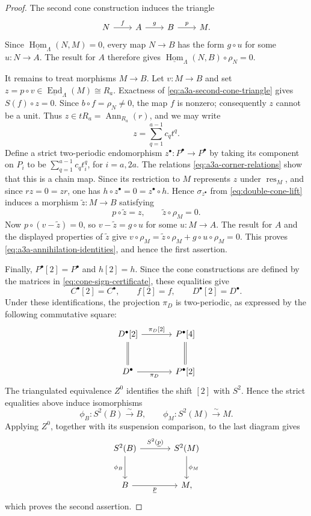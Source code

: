 \documentclass[a4paper,11pt,reqno]{amsart}
\theoremstyle{definition}
\theoremstyle{plain}
\numberwithin{equation}{section}
\newcommand{\Hom}{\operatorname{Hom}}
\newcommand{\End}{\operatorname{End}}
\begin{document}
\begin{proof}
The second cone construction induces the triangle
\begin{equation}
\label{eq:a3a-second-cone-triangle}
\begin{tikzcd}[column sep=2.2em]
N\arrow[r,"f"]&A\arrow[r,"g"]&B\arrow[r,"p"]&M.
\end{tikzcd}
\end{equation}
Since
\(\underline{\Hom}_\Lambda(N,M)=0\), every map \(N\to B\) has the form
\(g\circ u\) for some \(u:N\to A\).  The result for \(A\) therefore gives
\(\underline{\Hom}_\Lambda(N,B)\circ\rho_N=0\).

It remains to treat morphisms \(M\to B\).
Let \(v:M\to B\) and set \(z=p\circ v\in
\underline{\End}_\Lambda(M)\cong R_a\).  Exactness of
\eqref{eq:a3a-second-cone-triangle} gives \(S(f)\circ z=0\).  Since
\(b\circ f=\rho_N\ne0\), the map \(f\) is nonzero; consequently \(z\)
cannot be a unit.  Thus
\(z\in tR_a=\operatorname{Ann}_{R_a}(r)\), and we may write
\[
 z=\sum_{q=1}^{a-1}c_qt^q.
\]
Define a strict two-periodic endomorphism
\(z^\bullet:P^\bullet\to P^\bullet\) by taking its component on \(P_i\)
to be \(\sum_{q=1}^{a-1}c_qt_i^q\), for \(i=a,2a\).  The relations
\eqref{eq:a3a-corner-relations} show that this is a chain map.  Since
its restriction to \(M\) represents \(z\) under
\(\operatorname{res}_M\), and since
\(rz=0=zr\), one has
\(h\circ z^\bullet=0=z^\bullet\circ h\).  Hence
\(\sigma_{z^\bullet}\) from \eqref{eq:double-cone-lift} induces a morphism
\(\widetilde z:M\to B\) satisfying
\[
 p\circ\widetilde z=z,
 \qquad
 \widetilde z\circ\rho_M=0.
\]
Now \(p\circ(v-\widetilde z)=0\), so
\(v-\widetilde z=g\circ u\) for some \(u:M\to A\).  The result for \(A\)
and the displayed properties of \(\widetilde z\) give
\(v\circ\rho_M
=\widetilde z\circ\rho_M+g\circ u\circ\rho_M=0\).
This proves \eqref{eq:a3a-annihilation-identities}, and hence the first
assertion.

Finally, \(P^\bullet[2]=P^\bullet\) and \(h[2]=h\).  Since the cone
constructions are defined by the matrices in
\eqref{eq:cone-sign-certificate}, these equalities give
\[
 C^\bullet[2]=C^\bullet,\qquad
 f[2]=f,\qquad
 D^\bullet[2]=D^\bullet.
\]
Under these identifications, the projection \(\pi_D\) is
two-periodic, as expressed by the following commutative square:
\[
\begin{tikzcd}[column sep=large,row sep=large]
D^\bullet[2]\arrow[r,"{\pi_D[2]}"]\arrow[d,equal]&
P^\bullet[4]\arrow[d,equal]\\
D^\bullet\arrow[r,"\pi_D"']&P^\bullet[2]
\end{tikzcd}
\]
The triangulated equivalence \(Z^0\) identifies the shift \([2]\) with
\(S^2\).  Hence the strict equalities above induce isomorphisms
\[
 \phi_B:S^2(B)\xrightarrow{\sim}B,
 \qquad
 \phi_M:S^2(M)\xrightarrow{\sim}M.
\]
Applying \(Z^0\), together with its suspension comparison, to the last
diagram gives
\[
\begin{tikzcd}[column sep=large,row sep=large]
S^2(B)\arrow[r,"S^2(\underline p)"]\arrow[d,"\phi_B"']&
S^2(M)\arrow[d,"\phi_M"]\\
B\arrow[r,"\underline p"']&M,
\end{tikzcd}
\]
which proves the second assertion.
\end{proof}
\end{document}
